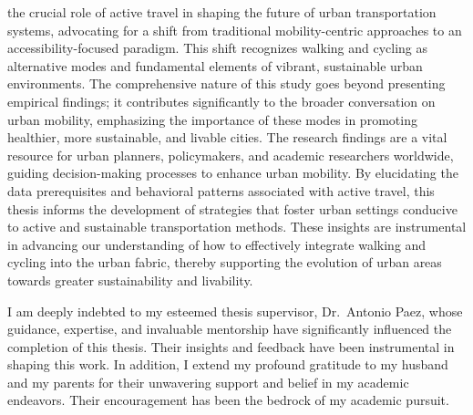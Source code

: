 \documentclass[
11pt, %
oneside, %
english, %
singlespacing, %
]{macthesis} %
\def\blankpage{%
      \clearpage%
      \thispagestyle{empty}%
      \addtocounter{page}{-1}%
      \null%
      \clearpage}
\begin{document}
the crucial role of active travel in shaping the future of urban transportation systems, advocating for a shift from traditional mobility-centric approaches to an accessibility-focused paradigm. This shift recognizes walking and cycling as alternative modes and fundamental elements of vibrant, sustainable urban environments. The comprehensive nature of this study goes beyond presenting empirical findings; it contributes significantly to the broader conversation on urban mobility, emphasizing the importance of these modes in promoting healthier, more sustainable, and livable cities. The research findings are a vital resource for urban planners, policymakers, and academic researchers worldwide, guiding decision-making processes to enhance urban mobility. By elucidating the data prerequisites and behavioral patterns associated with active travel, this thesis informs the development of strategies that foster urban settings conducive to active and sustainable transportation methods. These insights are instrumental in advancing our understanding of how to effectively integrate walking and cycling into the urban fabric, thereby supporting the evolution of urban areas towards greater sustainability and livability.
\blankpage
\clearpage


  \begin{acknowledgements}
  \addchaptertocentry{\acknowledgementname} %
    I am deeply indebted to my esteemed thesis supervisor, Dr.~Antonio Paez, whose guidance, expertise, and invaluable mentorship have significantly influenced the completion of this thesis. Their insights and feedback have been instrumental in shaping this work. In addition, I extend my profound gratitude to my husband and my parents for their unwavering support and belief in my academic endeavors. Their encouragement has been the bedrock of my academic pursuit.
  \end{acknowledgements}
\blankpage
\clearpage


\tableofcontents %
\end{document}

